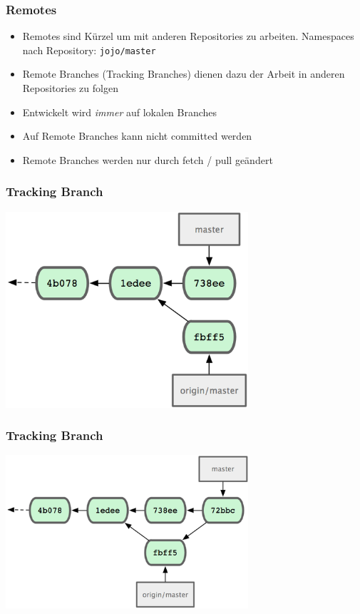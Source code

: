 \begin{frame}
  \frametitle{Remotes}
  \begin{itemize}
    \item Remotes sind Kürzel um mit anderen Repositories zu arbeiten. Namespaces nach Repository: {\tt jojo/master}
    \item Remote Branches (Tracking Branches) dienen dazu der Arbeit in anderen Repositories zu folgen
    \item Entwickelt wird \emph{immer} auf lokalen Branches
    \item Auf Remote Branches kann nicht committed werden
    \item Remote Branches werden nur durch fetch / pull geändert
  \end{itemize}
\end{frame}

\begin{frame}
  \frametitle{Tracking Branch}
  \begin{center}
    \includegraphics[width=9cm]{img/remote_1.png}
  \end{center}
\end{frame}

\begin{frame}
  \frametitle{Tracking Branch}
  \begin{center}
    \includegraphics[width=9cm]{img/remote_2.png}
  \end{center}
\end{frame}

